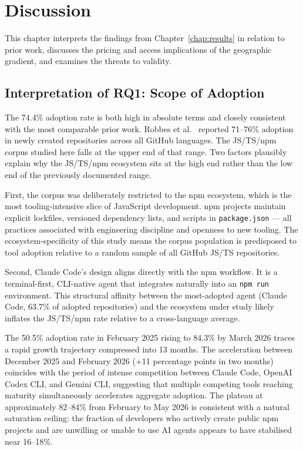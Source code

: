 
\chapter{Discussion}
\label{chap:discussion}

This chapter interprets the findings from Chapter~\ref{chap:results} in relation to prior work, discusses the pricing and access implications of the geographic gradient, and examines the threats to validity.

\section{Interpretation of RQ1: Scope of Adoption}
\label{sec:disc:rq1}

The 74.4\% adoption rate is both high in absolute terms and closely consistent with the most comparable prior work. Robbes et al.~\cite{robbesAgenticVery2026} reported 71--76\% adoption in newly created repositories across all GitHub languages. The JS/TS/npm corpus studied here falls at the upper end of that range. Two factors plausibly explain why the JS/TS/npm ecosystem sits at the high end rather than the low end of the previously documented range.

First, the corpus was deliberately restricted to the npm ecosystem, which is the most tooling-intensive slice of JavaScript development. npm projects maintain explicit lockfiles, versioned dependency lists, and scripts in \texttt{package.json} --- all practices associated with engineering discipline and openness to new tooling. The ecosystem-specificity of this study means the corpus population is predisposed to tool adoption relative to a random sample of all GitHub JS/TS repositories.

Second, Claude Code's design aligns directly with the npm workflow. It is a terminal-first, CLI-native agent that integrates naturally into an \texttt{npm run} environment. This structural affinity between the most-adopted agent (Claude Code, 63.7\% of adopted repositories) and the ecosystem under study likely inflates the JS/TS/npm rate relative to a cross-language average.

The 50.5\% adoption rate in February 2025 rising to 84.3\% by March 2026 traces a rapid growth trajectory compressed into 13 months. The acceleration between December 2025 and February 2026 (+11 percentage points in two months) coincides with the period of intense competition between Claude Code, OpenAI Codex CLI, and Gemini CLI, suggesting that multiple competing tools reaching maturity simultaneously accelerates aggregate adoption. The plateau at approximately 82--84\% from February to May 2026 is consistent with a natural saturation ceiling: the fraction of developers who actively create public npm projects and are unwilling or unable to use AI agents appears to have stabilised near 16--18\%.

